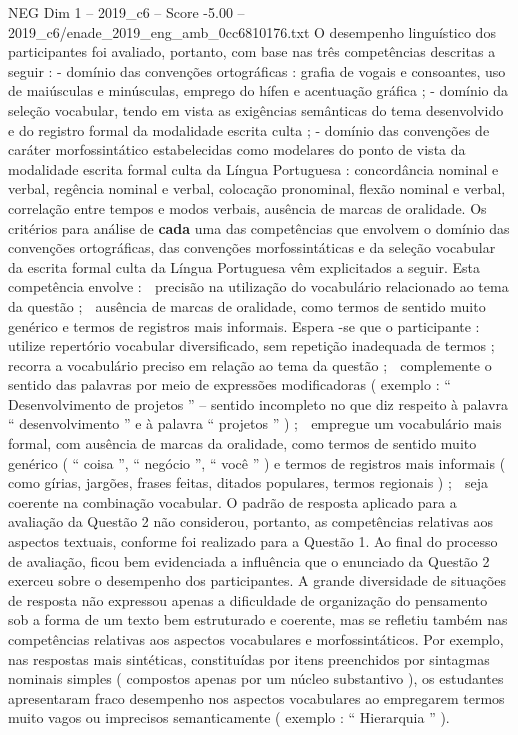 \begin{textsample}{NEG Dim 1 – 2019\_c6 – Score -5.00 – 2019\_c6/enade\_2019\_eng\_amb\_0cc6810176.txt}
O desempenho linguístico dos participantes foi avaliado, portanto, com base nas três competências descritas a seguir : - domínio das convenções ortográficas : grafia de vogais e consoantes, uso de maiúsculas e minúsculas, emprego do hífen e acentuação gráfica ; - domínio da seleção vocabular, tendo em vista as exigências semânticas do tema desenvolvido e do registro formal da modalidade escrita culta ; - domínio das convenções de caráter morfossintático estabelecidas como modelares do ponto de vista da modalidade escrita formal culta da Língua Portuguesa : concordância nominal e verbal, regência nominal e verbal, colocação pronominal, flexão nominal e verbal, correlação entre tempos e modos verbais, ausência de marcas de oralidade.
Os critérios para análise de \textbf{cada} uma das competências que envolvem o domínio das convenções ortográficas, das convenções morfossintáticas e da seleção vocabular da escrita formal culta da Língua Portuguesa vêm explicitados a seguir.
Esta competência envolve :  precisão na utilização do vocabulário relacionado ao tema da questão ;  ausência de marcas de oralidade, como termos de sentido muito genérico e termos de registros mais informais.
Espera -se que o participante :  utilize repertório vocabular diversificado, sem repetição inadequada de termos ;  recorra a vocabulário preciso em relação ao tema da questão ;  complemente o sentido das palavras por meio de expressões modificadoras ( exemplo : “ Desenvolvimento de projetos ” – sentido incompleto no que diz respeito à palavra “ desenvolvimento ” e à palavra “ projetos ” ) ;  empregue um vocabulário mais formal, com ausência de marcas da oralidade, como termos de sentido muito genérico ( “ coisa ”, “ negócio ”, “ você ” ) e termos de registros mais informais ( como gírias, jargões, frases feitas, ditados populares, termos regionais ) ;  seja coerente na combinação vocabular.
O padrão de resposta aplicado para a avaliação da Questão 2 não considerou, portanto, as competências relativas aos aspectos textuais, conforme foi realizado para a Questão 1.
Ao final do processo de avaliação, ficou bem evidenciada a influência que o enunciado da Questão 2 exerceu sobre o desempenho dos participantes.
A grande diversidade de situações de resposta não expressou apenas a dificuldade de organização do pensamento sob a forma de um texto bem estruturado e coerente, mas se refletiu também nas competências relativas aos aspectos vocabulares e morfossintáticos.
Por exemplo, nas respostas mais sintéticas, constituídas por itens preenchidos por sintagmas nominais simples ( compostos apenas por um núcleo substantivo ), os estudantes apresentaram fraco desempenho nos aspectos vocabulares ao empregarem termos muito vagos ou imprecisos semanticamente ( exemplo : “ Hierarquia ” ).

\end{textsample}
